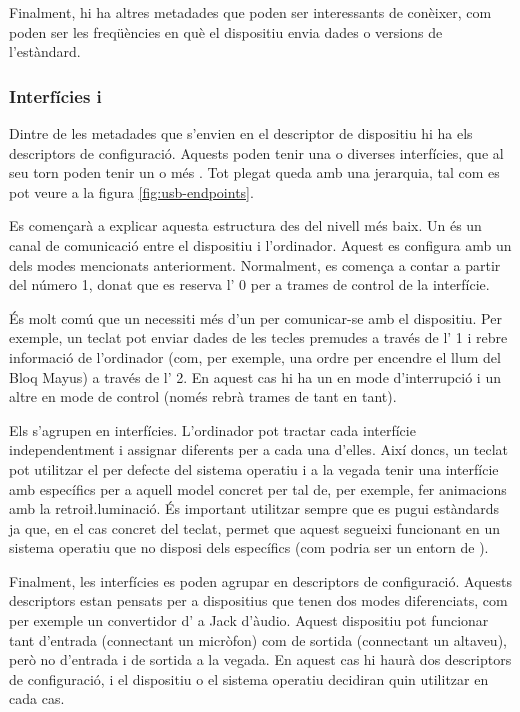 Finalment, hi ha altres metadades que poden ser interessants de conèixer, com
poden ser les freqüències en què el dispositiu envia dades o versions de
l'estàndard.

\subsubsection*{Interfícies i }

Dintre de les metadades que s'envien en el descriptor de dispositiu hi ha els
descriptors de configuració. Aquests poden tenir una o diverses interfícies, que
al seu torn poden tenir un o més . Tot plegat queda amb una
jerarquia, tal com es pot veure a la figura \ref{fig:usb-endpoints}.



Es començarà a explicar aquesta estructura des del nivell més baix. Un
 és un canal de comunicació entre el dispositiu i l'ordinador.
Aquest es configura amb un dels modes mencionats anteriorment. Normalment, es
comença a contar a partir del número 1, donat que es reserva l'
0 per a trames de control de la interfície.

És molt comú que un  necessiti més d'un  per
comunicar-se amb el dispositiu. Per exemple, un teclat pot enviar dades de les
tecles premudes a través de l' 1 i rebre informació de l'ordinador
(com, per exemple, una ordre per encendre el llum del Bloq Mayus) a través de
l' 2. En aquest cas hi ha un  en mode d'interrupció
i un altre en mode de control (només rebrà trames  de tant en tant).

Els  s'agrupen en interfícies. L'ordinador pot tractar cada
interfície independentment i assignar diferents  per a cada una
d'elles. Així doncs, un teclat pot utilitzar el  per defecte del
sistema operatiu i a la vegada tenir una interfície amb  específics
per a aquell model concret per tal de, per exemple, fer animacions amb la
retroi\l.luminació. És important utilitzar sempre que es pugui 
estàndards ja que, en el cas concret del teclat, permet que aquest segueixi
funcionant en un sistema operatiu que no disposi dels 
específics (com podria ser un entorn de ).

Finalment, les interfícies es poden agrupar en descriptors de configuració.
Aquests descriptors estan pensats per a dispositius que tenen dos modes
diferenciats, com per exemple un convertidor d' a Jack d'àudio. Aquest
dispositiu pot funcionar tant d'entrada (connectant un micròfon) com de sortida
(connectant un altaveu), però no d'entrada i de sortida a la vegada. En aquest
cas hi haurà dos descriptors de configuració, i el dispositiu o el sistema
operatiu decidiran quin utilitzar en cada cas.

